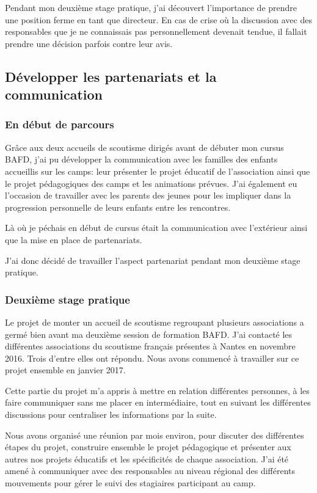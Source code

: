 \documentclass[titlepage,11pt,a4paper]{article}
\begin{document}
Pendant mon deuxième stage pratique, j'ai découvert l'importance de prendre une position
ferme en tant que directeur. En cas de crise où la discussion avec des responsables que je
ne connaissais pas personnellement devenait tendue, il fallait prendre une décision
parfois contre leur avis.

\subsection{Développer les partenariats et la communication}
\subsubsection{En début de parcours}

Grâce aux deux accueils de scoutisme dirigés avant de débuter mon cursus BAFD, j'ai
pu développer la communication avec les familles des enfants accueillis sur les camps:
leur présenter le projet éducatif de l'association ainsi que le projet pédagogiques des
camps et les animations prévues. J'ai également eu l'occasion de travailler avec les parents des jeunes pour les impliquer
dans la progression personnelle de leurs enfants entre les rencontres.

Là où je péchais en début de cursus était la communication avec l'extérieur ainsi que la
mise en place de partenariats.

J'ai donc décidé de travailler l'aspect partenariat pendant mon deuxième stage pratique.

\subsubsection{Deuxième stage pratique}

Le projet de monter un accueil de scoutisme regroupant plusieurs associations a germé bien avant ma
deuxième session de formation BAFD\@. J'ai contacté les différentes associations du
scoutisme français présentes à Nantes en novembre 2016. Trois d'entre elles ont répondu.
Nous avons commencé à travailler sur ce projet ensemble en janvier 2017.

Cette partie du projet m'a appris à mettre en relation différentes personnes, à les faire
communiquer sans me placer en intermédiaire, tout en suivant les différentes discussions
pour centraliser les informations par la suite.

Nous avons organisé une réunion par mois environ, pour discuter des différentes étapes du
projet, construire ensemble le projet pédagogique et présenter aux autres nos projets
éducatifs et les spécificités de chaque association. J'ai été amené à communiquer avec des
responsables au niveau régional des différents mouvements pour gérer le suivi des
stagiaires participant au camp.
\end{document}
